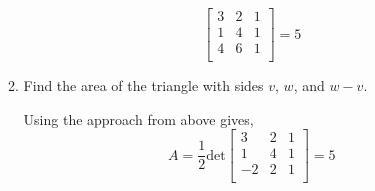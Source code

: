 \begin{enumerate}
\begin{enumerate}[label=\alph*.]
\begin{mdframed}[style=MyFrame]
\begin{equation}
\begin {bmatrix}
                            3           & 2         &   1   \\
                            1           & 4         &   1   \\
                            4           & 6         &   1   \\
                            \end{bmatrix}
                            = 5 
                        \end{equation}
                    \end{mdframed}
            \item Find the area of the triangle with sides $v$, $w$, and $w-v$.
                \begin{mdframed}[style=MyFrame]
                    Using the  approach from above gives,
                    \begin{equation}
                        A = \frac{1}{2}
                            \text{det}
                            \begin {bmatrix}
                                3           & 2         &   1   \\
                                1           & 4         &   1   \\
                                -2          & 2         &   1   \\
                            \end{bmatrix}
                            = 5 
                        \end{equation}
                    \end{mdframed}
        \end{enumerate}
\end{enumerate}
